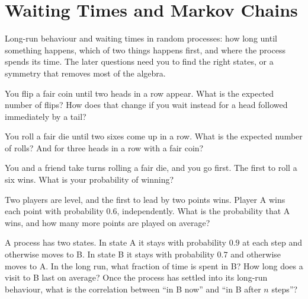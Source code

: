 \chapter{Waiting Times and Markov Chains}\label{ch:iv1:waiting-times-and-markov-chains}

\begin{ivtrains}
Long-run behaviour and waiting times in random processes: how long until something happens, which of two things happens
first, and where the process spends its time. The later questions need you to find the right states, or a symmetry that removes most
of the algebra.
\end{ivtrains}

\begin{question}\label{iq:iv1:waiting-times-and-markov-chains:1}
You flip a fair coin until two heads in a row appear. What is the expected number of flips? How does that change if you wait instead for a
head followed immediately by a tail?
\end{question}

\begin{question}\label{iq:iv1:waiting-times-and-markov-chains:2}
You roll a fair die until two sixes come up in a row. What is the expected number of rolls? And for three heads in a row with a fair coin?
\end{question}

\begin{question}\label{iq:iv1:waiting-times-and-markov-chains:3}
You and a friend take turns rolling a fair die, and you go first. The first to roll a six wins. What is your probability of winning?
\end{question}

\begin{question}\label{iq:iv1:waiting-times-and-markov-chains:4}
Two players are level, and the first to lead by two points wins. Player A wins each point with probability $0.6$, independently. What is the
probability that A wins, and how many more points are played on average?
\end{question}

\begin{question}\label{iq:iv1:waiting-times-and-markov-chains:5}
A process has two states. In state A it stays with probability $0.9$ at each step and otherwise moves to B. In state B it stays with
probability $0.7$ and otherwise moves to A. In the long run, what fraction of time is spent in B? How long does a visit to B last on average?
Once the process has settled into its long-run behaviour, what is the correlation between ``in B now'' and ``in B after $n$ steps''?
\end{question}

